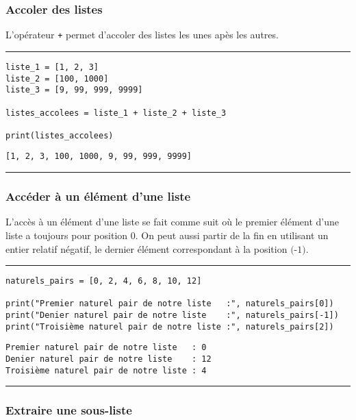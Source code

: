 \subsubsection{Accoler des listes}

L'opérateur \texttt{+} permet d'accoler des listes les unes apès les autres.


\bigskip
{\hrule height .5mm}
\begin{verbatim}
liste_1 = [1, 2, 3]
liste_2 = [100, 1000]
liste_3 = [9, 99, 999, 9999]

listes_accolees = liste_1 + liste_2 + liste_3

print(listes_accolees)
\end{verbatim}
 \color{ForestGreen}
\vspace{-1.5em}
\begin{verbatim}
[1, 2, 3, 100, 1000, 9, 99, 999, 9999]
\end{verbatim} \color{Black}
{\hrule height .5mm}
\bigskip


\subsubsection{Accéder à un élément d'une liste}

L'accès à un élément d'une liste se fait comme suit où le premier élément d'une liste a toujours pour position $0$. On peut aussi partir de la fin en utilisant un entier relatif négatif, le dernier élément correspondant à la position $\textit{(-1)}$.


\bigskip
{\hrule height .5mm}
\begin{verbatim}
naturels_pairs = [0, 2, 4, 6, 8, 10, 12]

print("Premier naturel pair de notre liste   :", naturels_pairs[0])
print("Denier naturel pair de notre liste    :", naturels_pairs[-1])
print("Troisième naturel pair de notre liste :", naturels_pairs[2])
\end{verbatim}
 \color{ForestGreen}
\vspace{-1.5em}
\begin{verbatim}
Premier naturel pair de notre liste   : 0
Denier naturel pair de notre liste    : 12
Troisième naturel pair de notre liste : 4
\end{verbatim} \color{Black}
{\hrule height .5mm}
\bigskip


\subsubsection{Extraire une sous-liste}

